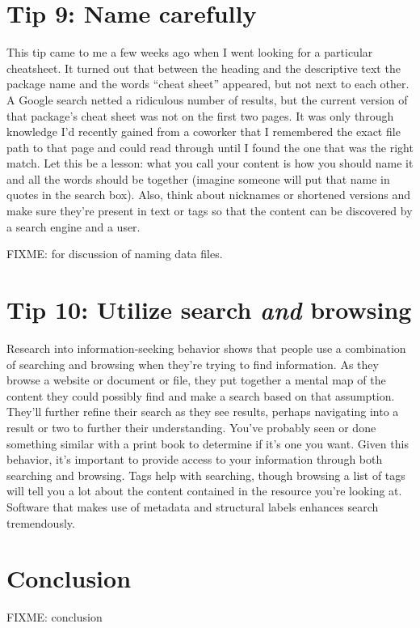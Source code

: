 \documentclass[10pt,letterpaper]{article}
\newcommand{\rulemajor}[1]{\section*{#1}}
\begin{document}
\rulemajor{Tip 9: Name carefully}

This tip came to me a few weeks ago when I went looking for a particular cheatsheet.
It turned out that between the heading and the descriptive text the package name and the words ``cheat sheet'' appeared,
but not next to each other.
A Google search netted a ridiculous number of results,
but the current version of that package's cheat sheet was not on the first two pages.
It was only through knowledge I'd recently gained from a coworker
that I remembered the exact file path to that page and could read through until I found the one that was the right match.
Let this be a lesson:
what you call your content is how you should name it
and all the words should be together (imagine someone will put that name in quotes in the search box).
Also,
think about nicknames or shortened versions and make sure they're present in text or tags
so that the content can be discovered by a search engine and a user.

FIXME: \cite{noble2009} for discussion of naming data files.

\rulemajor{Tip 10: Utilize search \emph{and} browsing}

Research into information-seeking behavior shows that
people use a combination of searching and browsing when they're trying to find information.
As they browse a website or document or file,
they put together a mental map of the content they could possibly find and make a search based on that assumption.
They'll further refine their search as they see results,
perhaps navigating into a result or two to further their understanding.
You've probably seen or done something similar with a print book to determine if it's one you want.
Given this behavior,
it's important to provide access to your information through both searching and browsing.
Tags help with searching,
though browsing a list of tags will tell you a lot about the content contained in the resource you're looking at.
Software that makes use of metadata and structural labels enhances search tremendously.

\section*{Conclusion}

FIXME: conclusion


\end{document}
